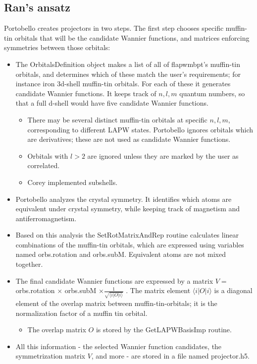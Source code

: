 \documentclass[aps,prb,singlecolumn,preprintnumbers,amsmath,amssymb]{revtex4}
\begin{document}
\subsection{Ran's ansatz}
Portobello creates projectors in two steps.  The first step chooses specific muffin-tin orbitals that will be the candidate Wannier functions, and matrices enforcing symmetries between those orbitals:
\begin{itemize}
\item The OrbitalsDefinition object  makes a list of all of flapwmbpt's muffin-tin orbitals, and determines which of these match the user's requirements; for instance iron 3d-shell muffin-tin orbitals. For each of these it generates candidate Wannier functions. It keeps track of  $n,l,m$ quantum numbers, so that a full d-shell would have five candidate Wannier functions.  
\begin{itemize}
\item There may be several distinct muffin-tin orbitals at specific $n,l,m$, corresponding to different LAPW states.  Portobello ignores orbitals which are derivatives; these are not used as candidate Wannier functions. 
\item Orbitals with $l > 2$ are ignored unless they are marked by the user as correlated.  
\item Corey implemented subshells.  
\end{itemize}
\item Portobello analyzes the crystal symmetry.  It  identifies which atoms are equivalent under crystal symmetry, while keeping track of magnetism and antiferromagnetism. 
\item Based on this analysis the SetRotMatrixAndRep routine calculates linear combinations of the muffin-tin orbitals, which are expressed using variables named orbs.rotation and orbs.subM.  Equivalent atoms are not mixed together.
\item The final candidate Wannier functions are expressed by a matrix $V = $ orbs.rotation $\times$ orbs.subM $\times \frac{1}{\sqrt{\langle i | O | i \rangle}}$ .  The matrix element $\langle i | O | i \rangle$ is a diagonal element of the overlap matrix between muffin-tin-orbitals; it is the normalization factor of a muffin tin orbital.
\begin{itemize}
\item The overlap matrix $O$ is stored by the GetLAPWBasisImp routine.
\end{itemize}
\item All this information - the selected Wannier function candidates, the symmetrization matrix $V$, and more - are stored in a file named projector.h5.
\end{itemize}
\end{document}
